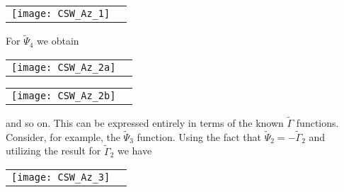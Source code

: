 \documentclass[english,american]{article}
\newcommand\myref{\refstepcounter{equation}\theequation}
\newcommand{\refmyref}[1]{\newcounter{#1}\setcounter{#1}{\theequation}}
\begin{document}
\begin{flushleft}
\begin{tabular}{>{\centering}m{}>{\centering}m{}}
\bigskip{}


\raggedright{}\centerline{\texttt{[image: CSW\_Az\_1]}} & \centering{}\centering{(\myref )}
\refmyref{Psi3_diag}\tabularnewline
\end{tabular}
\par\end{flushleft}

\noindent For $\tilde{\Psi}_{4}$ we obtain 

\begin{flushleft}
\begin{tabular}{>{\centering}m{}>{\centering}m{}}
\bigskip{}


\raggedright{}\centerline{\texttt{[image: CSW\_Az\_2a]}} & \tabularnewline
\end{tabular}
\par\end{flushleft}

\begin{flushleft}
\begin{tabular}{>{\centering}m{}>{\centering}m{}}
\raggedleft{}\texttt{[image: CSW\_Az\_2b]} & \centering{}\centering{(\myref )}
\refmyref{Psi4_diag}\tabularnewline
\end{tabular}
\par\end{flushleft}

\noindent and so on. This can be expressed entirely in terms of the known
$\tilde{\Gamma}$ functions. Consider, for example, the $\tilde{\Psi}_{3}$
function. Using the fact that $\tilde{\Psi}_{2}=-\tilde{\Gamma}_{2}$
and utilizing the result for $\tilde{\Gamma}_{2}$ we have

\begin{flushleft}
\begin{tabular}{>{\centering}m{}>{\centering}m{}}
\bigskip{}


\raggedright{}\centerline{\texttt{[image: CSW\_Az\_3]}} & \centering{}\centering{(\myref )}
\refmyref{Psi3_diag_1}\tabularnewline
\end{tabular}
\par\end{flushleft}
\end{document}
